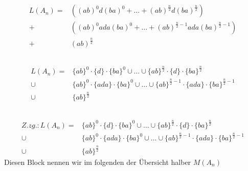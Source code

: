 \documentclass[12pt,a4paper]{../krautsourcing/homework}
\author{Ruben Felgenhauer,\\Alexander Hildebrandt,\\Leonhard Reichenbach}
\begin{document}
\makeheadline

\addtocounter{section}{2}

\section{}

\subsection{}
\begin{align*}
L(A_n) = &\left((ab)^0d(ba)^0 + \ldots + (ab)^{\frac{n}{2}}d(ba)^{\frac{n}{2}}\right)  \\
+ &\left((ab)^0ada(ba)^0 + \ldots + (ab)^{\frac{n}{2}-1}ada(ba)^{\frac{n}{2}-1}\right)\\
+ &\left( ab \right)^{\frac{n}{2}}
\end{align*}

\subsection{}
\begin{align*}
L(A_n) = & \{ab\}^0\cdot\{d\}\cdot\{ba\}^0 \cup \ldots \cup \{ab\}^{\frac{n}{2}}\cdot\{d\}\cdot\{ba\}^{\frac{n}{2}}  \\
 \cup &\{ab\}^0\cdot\{ada\}\cdot\{ba\}^0 \cup \ldots \cup \{ab\}^{\frac{n}{2}-1}\cdot\{ada\}\cdot\{ba\}^{\frac{n}{2}-1}\\
\cup & \{ab\} ^{\frac{n}{2}}
\end{align*}

\subsection{}
\begin{align*}
Z.zg.: L(A_n) = & \{ab\}^0\cdot\{d\}\cdot\{ba\}^0 \cup \ldots \cup \{ab\}^{\frac{n}{2}}\cdot\{d\}\cdot\{ba\}^{\frac{n}{2}}  \\
 \cup &\{ab\}^0\cdot\{ada\}\cdot\{ba\}^0 \cup \ldots \cup \{ab\}^{\frac{n}{2}-1}\cdot\{ada\}\cdot\{ba\}^{\frac{n}{2}-1}\\
\cup & \{ab\} ^{\frac{n}{2}}
\end{align*}
Diesen Block nennen wir im folgenden der Übersicht halber \(M(A_n)\)\\
\(\)
\end{document}
